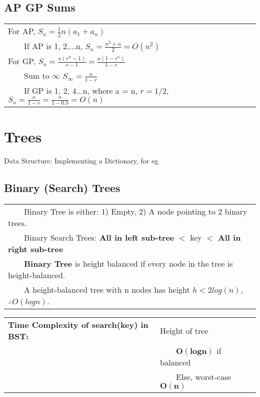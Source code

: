 \documentclass{article}
\newcommand{\tabitem}{~~\llap{\textbullet}~~}
\begin{document}
    \subsection{AP GP Sums}

    \begin{tabular}{l}
        \toprule
        For AP, $S_{n} = \frac{1}{2}n(a_{1} + a_{n})$\\
        \tabitem If AP is 1, 2,...n, $S_{n} = \frac{n^{2} + n}{2} = O(n^{2})$\\
        \midrule
        For GP, $S_{n} = \frac{a(r^{n}-1)}{r-1} = \frac{a(1 - r^{n})}{1- r}$\\
        \tabitem Sum to $\infty$ $S_{\infty} = \frac{a}{1-r}$\\
        \tabitem If GP is 1, 2, 4...n, where a = n, $r = 1/2$, $S_{n} = \frac{a}{1-r} = \frac{n}{1-0.5} = O(n)$\\
    \end{tabular}
    
    \pagebreak

    \section{Trees}

    Data Structure: Implementing a Dictionary, for eg

    \subsection{Binary (Search) Trees}

    \begin{tabular}{l}
        \tabitem Binary Tree is either: 1) Empty, 2) A node pointing to 2 binary trees.\\
        \tabitem Binary Search Trees: \textbf{All in left sub-tree} $<$ key $<$ \textbf{All in right sub-tree}\\
        \tabitem \textbf{Binary Tree} is height balanced if every node in the tree is height-balanced.\\
        \tabitem A height-balanced tree with n nodes has height $h < 2log(n)$, $\therefore O(logn)$.\\
    \end{tabular}
    \bigskip

    \noindent\begin{tabular}{ll}
        \textbf{Time Complexity of search(key) in BST:} & Height of tree\\
        & \tabitem $\bm{O(logn)}$ if balanced\\
        & \tabitem Else, worst-case $\bm{O(n)}$\\
    \end{tabular}
\end{document}
